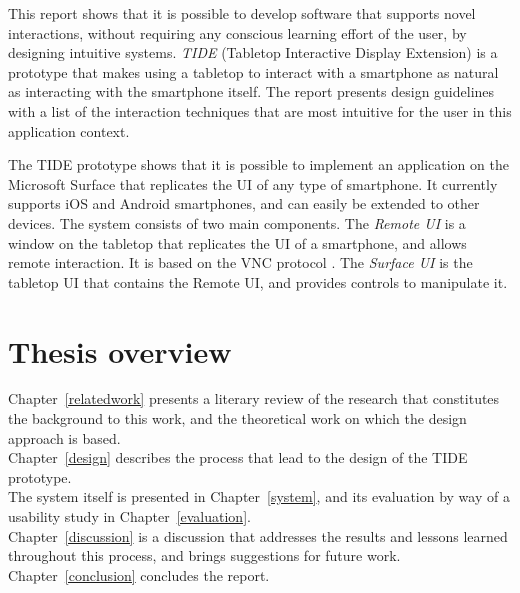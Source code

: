 
This report shows that it is possible to develop software that supports novel interactions, without requiring any conscious learning effort of the user, by designing intuitive systems.
\emph{TIDE} (Tabletop Interactive Display Extension) is a prototype that makes using a tabletop to interact with a smartphone as natural as interacting with the smartphone itself.
The report presents design guidelines with a list of the interaction techniques that are most intuitive for the user in this application context.

The TIDE prototype shows that it is possible to implement an application on the Microsoft Surface that replicates the UI of any type of smartphone.
It currently supports iOS and Android smartphones, and can easily be extended to other devices.
The system consists of two main components.
The \emph{Remote UI} is a window on the tabletop that replicates the UI of a smartphone, and allows remote interaction.
It is based on the VNC protocol \citep{Richardson:1998:vnc}.
The \emph{Surface UI} is the tabletop UI that contains the Remote UI, and provides controls to manipulate it.

\section{Thesis overview}

Chapter~\ref{relatedwork} presents a literary review of the research that constitutes the background to this work, and the theoretical work on which the design approach is based.\\
Chapter~\ref{design} describes the process that lead to the design of the TIDE prototype.\\
The system itself is presented in Chapter~\ref{system}, and its evaluation by way of a usability study in Chapter~\ref{evaluation}.\\
Chapter~\ref{discussion} is a discussion that addresses the results and lessons learned throughout this process, and brings suggestions for future work.\\
Chapter~\ref{conclusion} concludes the report.

